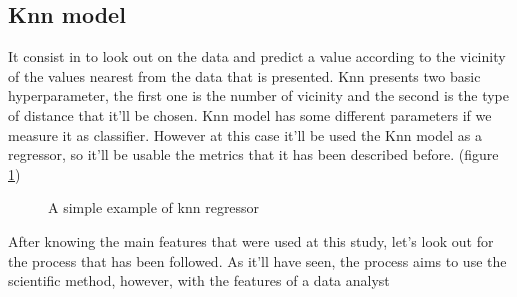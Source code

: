 \documentclass{article}
\begin{document}
\subsection{Knn model}
It consist in to look out on the data and predict a value according to the vicinity of the values nearest from the data that is presented. Knn presents two basic hyperparameter, the first one is the number of vicinity and the second is the type of distance that it'll be chosen.
Knn model has some different parameters if we measure it as classifier. However at this case it'll be used the Knn model as a regressor, so it'll be usable the metrics that it has been described before.
(figure \ref{fig:example4})
\begin{figure}[H]
  \centering
{}

  \caption{A simple example of knn regressor}
  \label{fig:example4}
\end{figure}
After knowing the main features that were used at this study, let's look out for the process that has been followed. As it'll have seen, the process aims to use the scientific method, however, with the features of a data analyst
\end{document}
